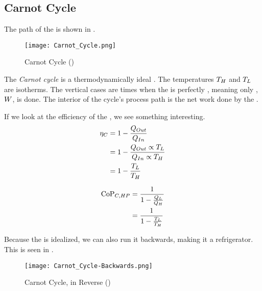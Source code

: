\subsection{Carnot Cycle}\label{subsec:Carnot_Cycle}
The  path of the  is shown in .

\begin{figure}[h!tbp]
  \centering
  \texttt{[image: Carnot\_Cycle.png]}
  \caption{Carnot Cycle (\cite[pg. 252]{ThermoTextbook})}
  \label{fig:Carnot_Cycle}
\end{figure}

\begin{definition}\label{def:Carnot_Cycle}
  The \emph{Carnot cycle} is a thermodynamically ideal .
  The temperatures $T_{H}$ and $T_{L}$ are isotherms.
  The vertical cases are times when the  is perfectly , meaning only , $W$, is done.
  The interior of the cycle's process path is the net work done by the .
\end{definition}

If we look at the efficiency of the , we see something interesting.
\begin{align*}
  \eta_{C} &= 1 - \frac{Q_{Out}}{Q_{In}} \\
                  &= 1 - \frac{Q_{Out} \propto T_{L}}{Q_{In} \propto T_{H}} \\
                  &= 1 - \frac{T_{L}}{T_{H}}
\end{align*}

\begin{equation}\label{eq:Coefficient_of_Performance-Carnot_Cycle}
  \begin{aligned}
    \text{CoP}_{C, HP} &= \frac{1}{1 - \frac{Q_{L}}{Q_{H}}} \\
    &= \frac{1}{1 - \frac{T_{L}}{T_{H}}} \\
  \end{aligned}
\end{equation}

Because the  is idealized, we can also run it backwards, making it a refrigerator.
This is seen in .

\begin{figure}[h!tbp]
  \centering
  \texttt{[image: Carnot\_Cycle-Backwards.png]}
  \caption{Carnot Cycle, in Reverse (\cite[pg. 253]{ThermoTextbook})}
  \label{fig:Carnot_Cycle-Backwards}
\end{figure}

